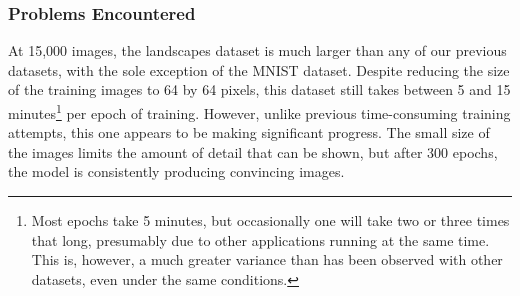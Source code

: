 \documentclass[12pt,letterpaper]{article}
\begin{document}
	\subsubsection{Problems Encountered}
	At 15,000 images, the landscapes dataset is much larger than any of our previous datasets, with the sole exception of the MNIST dataset.
	Despite reducing the size of the training images to 64 by 64 pixels, this dataset still takes between 5 and 15 minutes\footnote{Most epochs take 5 minutes, but occasionally one will take two or three times that long, presumably due to other applications running at the same time. This is, however, a much greater variance than has been observed with other datasets, even under the same conditions.} per epoch of training.
	However, unlike previous time-consuming training attempts, this one appears to be making significant progress.
	The small size of the images limits the amount of detail that can be shown, but after 300 epochs, the model is consistently producing convincing images.


\nocite{*}
\end{document}
